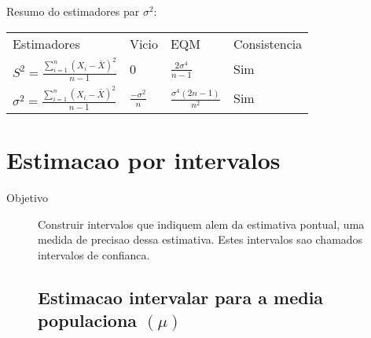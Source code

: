 \begin{description}
   Resumo do estimadores par $\sigma^2$:
   \begin{tabular}{l l l l}
Estimadores    & Vicio  & EQM &  Consistencia\\
$S^2= \frac{\sum \limits_{i=1}^{n} \left(X_i - \bar{X}\right)^2}{n-1}$& 0 & $\frac{2 \sigma^4}{n-1}$& Sim \\
$\sigma^2= \frac{\sum \limits_{i=1}^{n} \left(X_i - \bar{X}\right)^2}{n-1}$& $\frac{-\sigma^2}{n}$ & $\frac{\sigma^4 \left(2n-1\right)}{n^2}$& Sim
   \end{tabular}
\end{description}
\section{Estimacao por intervalos}
\begin{description}
  \item [Objetivo]  Construir intervalos que indiquem alem da estimativa pontual, uma medida de precisao dessa estimativa. Estes intervalos sao chamados intervalos de confianca.
    \subsection{Estimacao intervalar para a media populaciona $(\mu)$}
\end{description}
